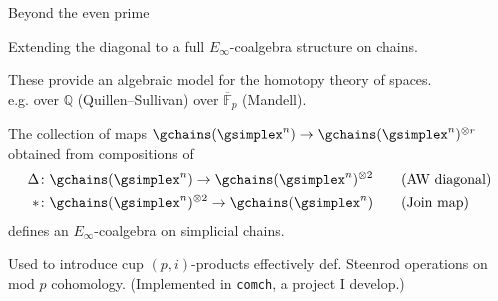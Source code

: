 
\begin{frame}[t]{Beyond the even prime}
	\pause

	Extending the diagonal to a full \textcolor{pblue}{$E_\infty$-coalgebra} structure on chains.

	\smallskip\pause

	These provide an algebraic model for the homotopy theory of spaces.\\ e.g. over $\mathbb Q$ (Quillen--Sullivan) over $\overline{\mathbb F}_p$ (Mandell).

	\smallskip\pause

	\begin{theorem}[Med.]
		The collection of maps $\gchains(\gsimplex^n) \to \gchains(\gsimplex^n)^{\otimes r}$ obtained from compositions of
		\begin{align*}
		\Delta &\colon \gchains(\gsimplex^n) \to \gchains(\gsimplex^n)^{\otimes 2}
		\qquad \text{(AW diagonal)} \\
		\ast &\colon \gchains(\gsimplex^n)^{\otimes 2} \to \gchains(\gsimplex^n)
		\qquad \text{(Join map)}
		\end{align*}
		defines an $E_\infty$-coalgebra on simplicial chains.
	\end{theorem}

	\pause {} \pause

	Used to introduce cup $(p,i)$-products effectively def. \textcolor{pblue}{Steenrod operations} on mod $p$ cohomology.
	\pause (Implemented in \texttt{comch}, a project I develop.)

	\smallskip\pause

\end{frame}
